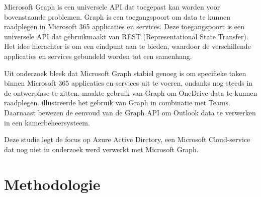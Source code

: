 Microsoft Graph is een universele API dat toegepast kan worden voor bovenstaande problemen. Graph is een toegangspoort om data te kunnen raadplegen in Microsoft 365 applicaties en services. Deze toegangspoort is een universele API dat gebruikmaakt van REST (Representational State Transfer). Het idee hierachter is om een eindpunt aan te bieden, waardoor de verschillende applicaties en services gebundeld worden tot een samenhang. 

Uit onderzoek bleek dat Microsoft Graph stabiel genoeg is om specifieke taken binnen Microsoft 365 applicaties en services uit te voeren, ondanks nog steeds in de ontwerpfase te zitten. \textcite{Hoefling2022} maakte gebruik van Graph om OneDrive data te kunnen raadplegen. \textcite{Jenkins2021} illustreerde het gebruik van Graph in combinatie met Teams. Daarnaast bewezen \textcite{Parsa2019} de eenvoud van de Graph API om Outlook data te verwerken in een kamerbeheersysteem. 

Deze studie legt de focus op Azure Active Dirctory, een Microsoft Cloud-service dat nog niet in onderzoek werd verwerkt met Microsoft Graph. 

\section{Methodologie}%
\label{sec:methodologie}


